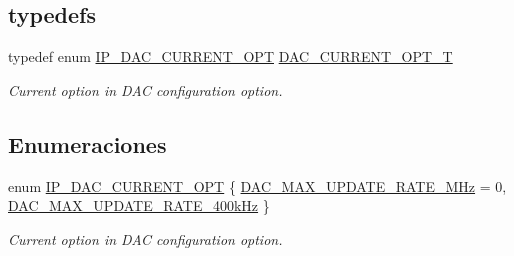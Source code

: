 \subsection*{\textquotesingle{}typedefs\textquotesingle{}}
\begin{DoxyCompactItemize}
\item 
typedef enum \hyperlink{group___d_a_c__18_x_x__43_x_x_gae1ca4fc402c9d7e40090ce7897613194}{I\+P\+\_\+\+D\+A\+C\+\_\+\+C\+U\+R\+R\+E\+N\+T\+\_\+\+O\+PT} \hyperlink{group___d_a_c__18_x_x__43_x_x_ga590be276dee4e713d18efcb71e3d7a7c}{D\+A\+C\+\_\+\+C\+U\+R\+R\+E\+N\+T\+\_\+\+O\+P\+T\+\_\+T}
\begin{DoxyCompactList}\small\item\em Current option in D\+AC configuration option. \end{DoxyCompactList}\end{DoxyCompactItemize}
\subsection*{Enumeraciones}
\begin{DoxyCompactItemize}
\item 
enum \hyperlink{group___d_a_c__18_x_x__43_x_x_gae1ca4fc402c9d7e40090ce7897613194}{I\+P\+\_\+\+D\+A\+C\+\_\+\+C\+U\+R\+R\+E\+N\+T\+\_\+\+O\+PT} \{ \hyperlink{group___d_a_c__18_x_x__43_x_x_ggae1ca4fc402c9d7e40090ce7897613194a6cbe5615f534716fd5228b011d36a405}{D\+A\+C\+\_\+\+M\+A\+X\+\_\+\+U\+P\+D\+A\+T\+E\+\_\+\+R\+A\+T\+E\+\_\+M\+Hz} = 0, 
\hyperlink{group___d_a_c__18_x_x__43_x_x_ggae1ca4fc402c9d7e40090ce7897613194a306308068cf75cb045ed9ce3ec9bbfc7}{D\+A\+C\+\_\+\+M\+A\+X\+\_\+\+U\+P\+D\+A\+T\+E\+\_\+\+R\+A\+T\+E\+\_\+400k\+Hz}
 \}\begin{DoxyCompactList}\small\item\em Current option in D\+AC configuration option. \end{DoxyCompactList}
\end{DoxyCompactItemize}
